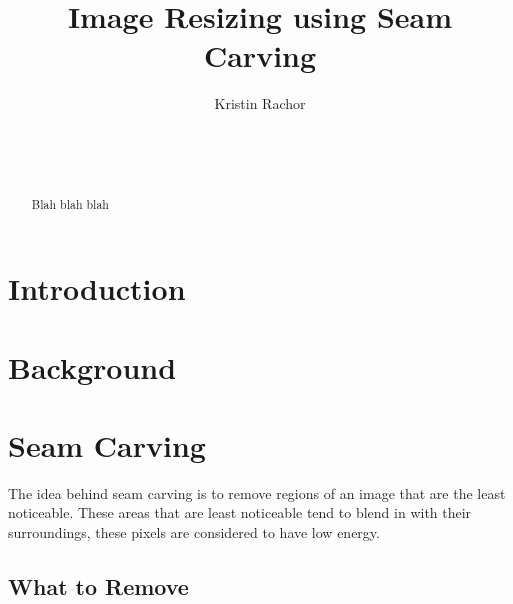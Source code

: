\documentclass{sig-alternate}
\begin{document}

\title{Image Resizing using Seam Carving}


\author{
\alignauthor
Kristin Rachor\\
	\\
	\\
	\\
}

\maketitle
\begin{abstract}
Blah blah blah

\end{abstract}


\section{Introduction}
\label{sec:introduction}

\section{Background}
\label{sec:background}

\section{Seam Carving}
\label{sec:seamCarving}

The idea behind seam carving is to remove regions of an image that are the least noticeable. These areas that are least noticeable tend to blend in with their surroundings, these pixels are considered to have low energy. 
\cite{Avidan:2007:SCC:1276377.1276390}


\subsection{What to Remove}
\label{sec:whatToRemove} 
\end{document}
